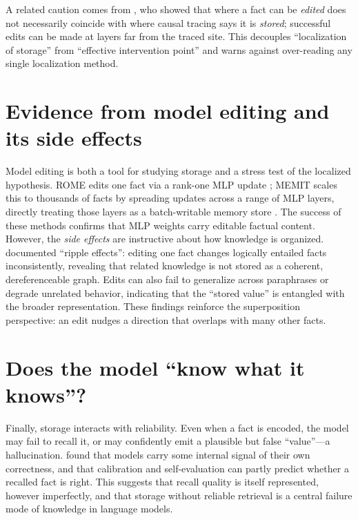 \documentclass[11pt]{article}
\begin{document}
A related caution comes from \citet{hase2023does}, who showed that where a fact can be \emph{edited} does not necessarily coincide with where causal tracing says it is \emph{stored}; successful edits can be made at layers far from the traced site. This decouples ``localization of storage'' from ``effective intervention point'' and warns against over-reading any single localization method.

\section{Evidence from model editing and its side effects}
Model editing is both a tool for studying storage and a stress test of the localized hypothesis. ROME edits one fact via a rank-one MLP update \citep{meng2022rome}; MEMIT scales this to thousands of facts by spreading updates across a range of MLP layers, directly treating those layers as a batch-writable memory store \citep{meng2022memit}. The success of these methods confirms that MLP weights carry editable factual content. However, the \emph{side effects} are instructive about how knowledge is organized. \citet{cohen2023ripple} documented ``ripple effects'': editing one fact changes logically entailed facts inconsistently, revealing that related knowledge is not stored as a coherent, dereferenceable graph. Edits can also fail to generalize across paraphrases or degrade unrelated behavior, indicating that the ``stored value'' is entangled with the broader representation. These findings reinforce the superposition perspective: an edit nudges a direction that overlaps with many other facts.

\section{Does the model ``know what it knows''?}
Finally, storage interacts with reliability. Even when a fact is encoded, the model may fail to recall it, or may confidently emit a plausible but false ``value''---a hallucination. \citet{kadavath2022know} found that models carry some internal signal of their own correctness, and that calibration and self-evaluation can partly predict whether a recalled fact is right. This suggests that recall quality is itself represented, however imperfectly, and that storage without reliable retrieval is a central failure mode of knowledge in language models.
\end{document}
